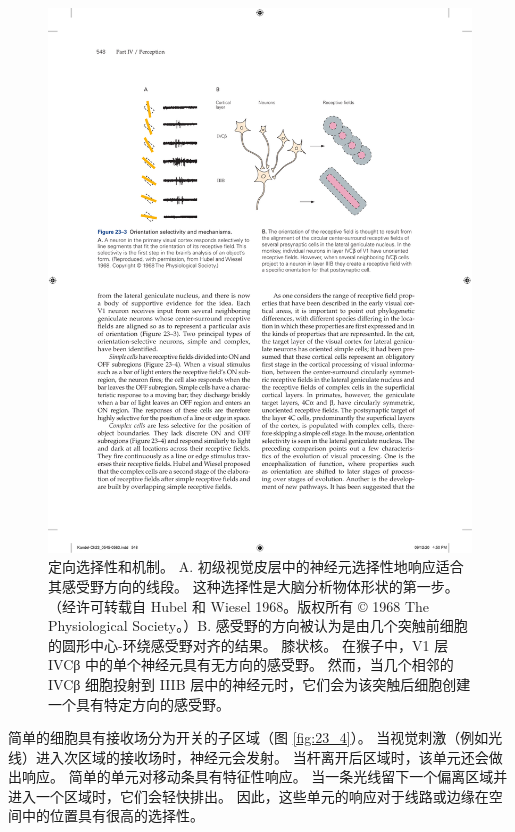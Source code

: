 \begin{figure}[htbp]
	\centering
	\includegraphics[width=0.7\linewidth]{chap23/fig_23_3}
	\caption{定向选择性和机制。 A. 初级视觉皮层中的神经元选择性地响应适合其感受野方向的线段。 这种选择性是大脑分析物体形状的第一步。 （经许可转载自 Hubel 和 Wiesel 1968。版权所有 © 1968 The Physiological Society。）B. 感受野的方向被认为是由几个突触前细胞的圆形中心-环绕感受野对齐的结果。 膝状核。 在猴子中，V1 层 IVCβ 中的单个神经元具有无方向的感受野。 然而，当几个相邻的 IVCβ 细胞投射到 IIIB 层中的神经元时，它们会为该突触后细胞创建一个具有特定方向的感受野。}
	\label{fig:23_3}
\end{figure}


简单的细胞具有接收场分为开关的子区域（图 \ref{fig:23_4}）。 当视觉刺激（例如光线）进入次区域的接收场时，神经元会发射。 
当杆离开后区域时，该单元还会做出响应。 
简单的单元对移动条具有特征性响应。 
当一条光线留下一个偏离区域并进入一个区域时，它们会轻快排出。 
因此，这些单元的响应对于线路或边缘在空间中的位置具有很高的选择性。

